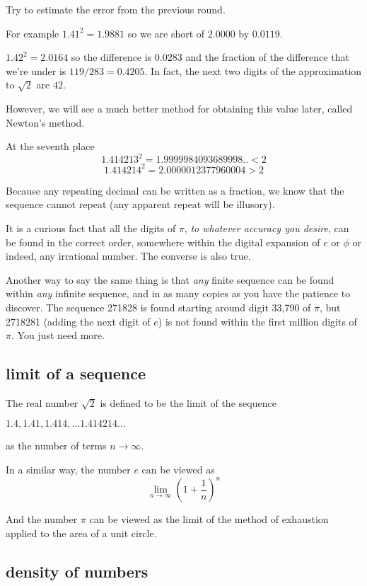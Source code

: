 \documentclass[11pt, oneside]{article}
\begin{document}
Try to estimate the error from the previous round.  

For example $1.41^2 = 1.9881$ so we are short of $2.0000$ by $0.0119$.  

$1.42^2 = 2.0164$ so the difference is $0.0283$ and the fraction of the difference that we're under is $119/283 = 0.4205$.  In fact, the next two digits of the approximation to $\sqrt{2}$ are $42$.

However, we will see a much better method for obtaining this value later, called Newton's method.

At the seventh place
\[ 1.414213^2 = 1.9999984093689998.. < 2 \]
\[ 1.414214^2 = 2.0000012377960004 > 2 \]

Because any repeating decimal can be written as a fraction, we know that the sequence cannot repeat (any apparent repeat will be illusory).  

It is a curious fact that all the digits of $\pi$, \emph{to whatever accuracy you desire}, can be found in the correct order, somewhere within the digital expansion of $e$ or $\phi$ or indeed, any irrational number.  The converse is also true.

Another way to say the same thing is that \emph{any} finite sequence can be found within \emph{any} infinite sequence, and in as many copies as you have the patience to discover.  The sequence 271828 is found starting around digit 33,790 of $\pi$, but 2718281 (adding the next digit of $e$) is not found within the first million digits of $\pi$.  You just need more.

\subsection*{limit of a sequence}

The real number $\sqrt{2}$ is defined to be the limit of the sequence 

$1.4, 1.41, 1.414, \dots 1.414214 \dots$ 

as the number of terms $n \rightarrow \infty$.

In a similar way, the number $e$ can be viewed as
\[ \lim_{n \rightarrow \infty} (1 + \frac{1}{n})^n \]

And the number $\pi$ can be viewed as the limit of the method of exhaustion applied to the area of a unit circle.

\subsection*{density of numbers}
\end{document}
